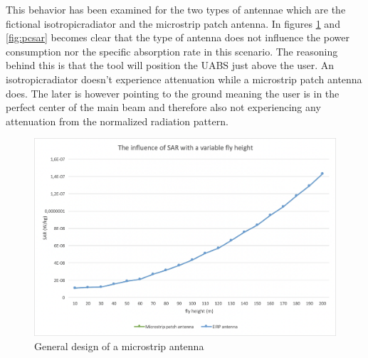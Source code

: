 This behavior has been examined for the two types of antennae which are the fictional \gls{isotropicradiator} and the microstrip patch antenna. In figures 
\ref{fig:fhsar} and \ref{fig:pcsar} becomes clear that the type of antenna does not influence the power consumption nor the specific absorption rate in this  scenario.
The reasoning behind this is that the tool will position the \gls{UABS} just above the user. An \gls{isotropicradiator} doesn't experience attenuation while a microstrip
patch antenna does. The later is however pointing to the ground meaning the user is in the perfect center of the main beam and therefore also
not experiencing any attenuation from the normalized radiation pattern.


\begin{figure}[th!]
  \includegraphics[width=\textwidth]{../results/s1/flyheight-sar.png}
  \caption{General design of a microstrip antenna}
  \label{fig:fhsar}
\end{figure}

